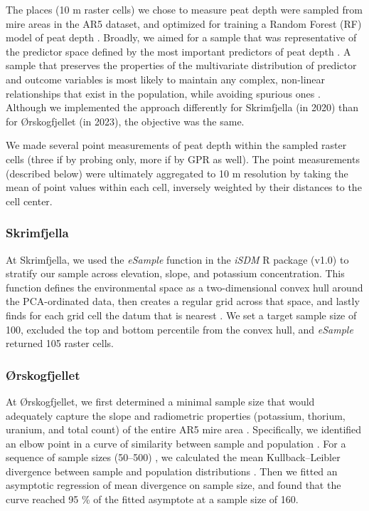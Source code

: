 \documentclass[soil, manuscript]{copernicus}
\begin{document}
The places (10 m raster cells) we chose to measure peat depth were sampled from mire areas in the AR5 dataset, and optimized for training a Random Forest (RF) model of peat depth \citep{brusSamplingDigitalSoil2019}.
Broadly, we aimed for a sample that was representative of the predictor space defined by the most important predictors of peat depth \citep{wadouxSamplingDesignOptimization2019, maComparisonConditionedLatin2020}.
A sample that preserves the properties of the multivariate distribution of predictor and outcome variables is most likely to maintain any complex, non-linear relationships that exist in the population, while avoiding spurious ones \citep{brusSamplingDigitalSoil2019}.
Although we implemented the approach differently for Skrimfjella (in 2020) than for Ørskogfjellet (in 2023), the objective was the same.

We made several point measurements of peat depth within the sampled raster cells (three if by probing only, more if by GPR as well).
The point measurements (described below) were ultimately aggregated to 10 m resolution by taking the mean of point values within each cell, inversely weighted by their distances to the cell center.

\subsubsection{Skrimfjella}

At Skrimfjella, we used the \emph{eSample} function in the \emph{iSDM} R package (v1.0) to stratify our sample across elevation, slope, and potassium concentration.
This function defines the environmental space as a two-dimensional convex hull around the PCA-ordinated data, then creates a regular grid across that space, and lastly finds for each grid cell the datum that is nearest \citep{hattabUnifiedFrameworkModel2017}.
We set a target sample size of 100, excluded the top and bottom percentile from the convex hull, and \emph{eSample} returned 105 raster cells.

\subsubsection{Ørskogfjellet}

At Ørskogfjellet, we first determined a minimal sample size that would adequately capture the slope and radiometric properties (potassium, thorium, uranium, and total count) of the entire AR5 mire area \citep{sauretteDivergenceMetricsDetermining2023}.
Specifically, we identified an elbow point in a curve of similarity between sample and population \citep{maloneMethodsImproveUtility2019}.
For a sequence of sample sizes (50--500) \citep[ten replicates each, drawn by conditioned latin hypercube sampling,][]{minasnyConditionedLatinHypercube2006, roudierClhsPackageConditioned2011}, we calculated the mean Kullback--Leibler divergence between sample and population distributions \citep{maloneMethodsImproveUtility2019, sauretteDivergenceMetricsDetermining2023}.
Then we fitted an asymptotic regression of mean divergence on sample size, and found that the curve reached 95 \% of the fitted asymptote at a sample size of 160.
\end{document}
